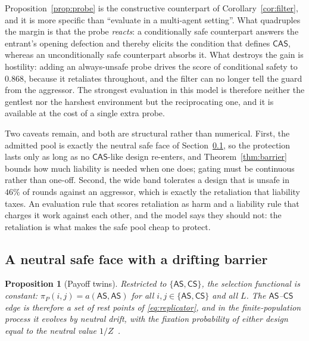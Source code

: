 \documentclass[11pt,a4paper]{article}
\newtheorem{proposition}[theorem]{Proposition}
\theoremstyle{definition}
\newcommand{\AS}{\textsf{AS}}
\newcommand{\CS}{\textsf{CS}}
\newcommand{\CAS}{\textsf{CAS}}
\newcommand{\piP}{\pi_{P}}
\begin{document}
Proposition~\ref{prop:probe} is the constructive counterpart of
Corollary~\ref{cor:filter}, and it is more specific than ``evaluate in a
multi-agent setting''. What quadruples the margin is that the probe
\emph{reacts}: a conditionally safe counterpart answers the entrant's opening
defection and thereby elicits the condition that defines $\CAS$, whereas an
unconditionally safe counterpart absorbs it. What destroys the gain is
hostility: adding an always-unsafe probe drives the score of conditional
safety to $0.868$, because it retaliates throughout, and the filter can no
longer tell the guard from the aggressor. The strongest evaluation in this
model is therefore neither the gentlest nor the harshest environment but the
reciprocating one, and it is available at the cost of a single extra probe.

Two caveats remain, and both are structural rather than numerical. First, the
admitted pool is exactly the neutral safe face of Section~\ref{sec:face}, so
the protection lasts only as long as no $\CAS$-like design re-enters, and
Theorem~\ref{thm:barrier} bounds how much liability is needed when one does;
gating must be continuous rather than one-off. Second, the wide band tolerates
a design that is unsafe in $46\%$ of rounds against an aggressor, which is
exactly the retaliation that liability taxes. An evaluation rule that scores
retaliation as harm and a liability rule that charges it work against each
other, and the model says they should not: the retaliation is what makes the
safe pool cheap to protect.

\subsection{A neutral safe face with a drifting barrier}\label{sec:face}

\begin{proposition}[Payoff twins]\label{prop:twins}
Restricted to $\{\AS,\CS\}$, the selection functional is constant:
$\piP(i,j)=a(\AS,\AS)$ for all $i,j\in\{\AS,\CS\}$ and all $L$. The
$\AS$--$\CS$ edge is therefore a set of rest points of
\eqref{eq:replicator}, and in the finite-population process it evolves by
neutral drift, with the fixation probability of either design equal to the
neutral value $1/Z$~\citep{nowak2004emergence}.
\end{proposition}
\end{document}
